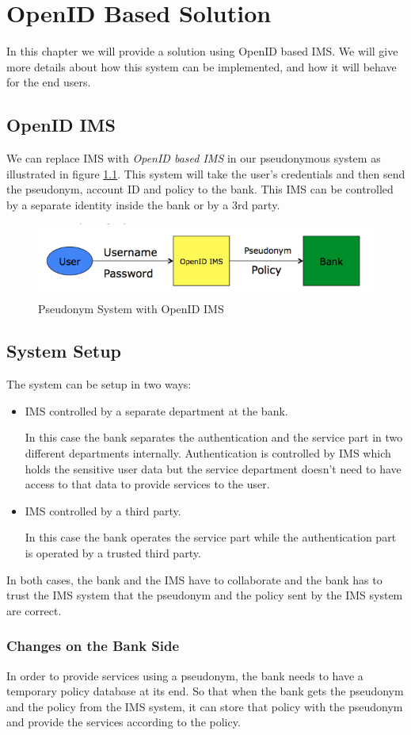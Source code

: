 \chapter{OpenID Based Solution}
In this chapter we will provide a solution using OpenID based IMS. We will give more details about how this system can be implemented, and how it will behave for the end users.
\section{OpenID IMS}
We can replace IMS with \textit{OpenID based IMS} in our pseudonymous system as illustrated in figure \ref{fig:OpenID}. This system will take the user's credentials and then send the pseudonym, account ID and policy to the bank. This IMS can be controlled by a separate identity inside the bank or by a 3rd party.
\begin{figure}[h]
	\centering
	\includegraphics[width=\textwidth]{figures/OpenID}
	\caption{Pseudonym System with OpenID IMS}
	\label{fig:OpenID}
\end{figure}
\section{System Setup}
The system can be setup in two ways:
\begin{itemize}
	\item IMS controlled by a separate department at the bank.
	
	In this case the bank separates the authentication and the service part in two different departments internally. Authentication is controlled by IMS which holds the sensitive user data but the service department doesn't need to have access to that data to provide services to the user.
	\item IMS controlled by a third party.
	
	In this case the bank operates the service part while the authentication part is operated by a trusted third party.
\end{itemize}
In both cases, the bank and the IMS have to collaborate and the bank has to trust the IMS system that the pseudonym and the policy sent by the IMS system are correct.
\subsection{Changes on the Bank Side}
In order to provide services using a pseudonym, the bank needs to have a temporary policy database at its end. So that when the bank gets the pseudonym and the policy from the IMS system, it can store that policy with the pseudonym and provide the services according to the policy.
